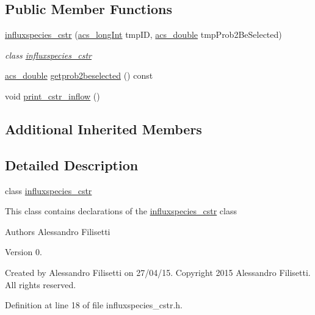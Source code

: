 \subsection*{Public Member Functions}
\begin{DoxyCompactItemize}
\item 
\hyperlink{a00014_ad4a7f03d7ac98571a8ae2fffa9463cdf}{influxspecies\-\_\-cstr} (\hyperlink{a00024_a19319d75f02db4308bc5c0026d98cd85}{acs\-\_\-long\-Int} tmp\-I\-D, \hyperlink{a00024_ab776853a005fcbf56af0424a2a4dd607}{acs\-\_\-double} tmp\-Prob2\-Be\-Selected)
\begin{DoxyCompactList}\small\item\em class \hyperlink{a00014}{influxspecies\-\_\-cstr} \end{DoxyCompactList}\item 
\hyperlink{a00024_ab776853a005fcbf56af0424a2a4dd607}{acs\-\_\-double} \hyperlink{a00014_a4a7b759d619a9d7e1b98f2ea49c371dc}{getprob2beselected} () const 
\item 
void \hyperlink{a00014_a2f75b87b09f836fdfdddac660972f775}{print\-\_\-cstr\-\_\-inflow} ()
\end{DoxyCompactItemize}
\subsection*{Additional Inherited Members}


\subsection{Detailed Description}
class \hyperlink{a00014}{influxspecies\-\_\-cstr} 

This class contains declarations of the \hyperlink{a00014}{influxspecies\-\_\-cstr} class

\begin{DoxyAuthor}{Authors}
Alessandro Filisetti 
\end{DoxyAuthor}
\begin{DoxyVersion}{Version}
0.
\end{DoxyVersion}
Created by Alessandro Filisetti on 27/04/15. Copyright 2015 Alessandro Filisetti. All rights reserved. 

Definition at line 18 of file influxspecies\-\_\-cstr.\-h.



